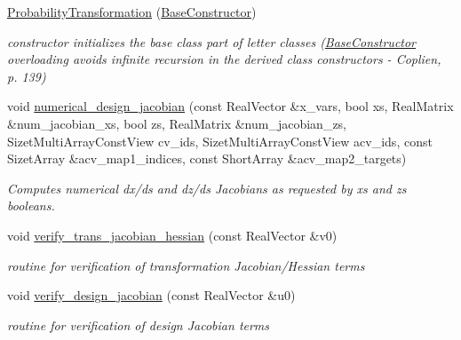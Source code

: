 \begin{DoxyCompactItemize}
\item 
\hyperlink{classPecos_1_1ProbabilityTransformation_a93e51d98c47f5a406a0cf59130cf8927}{Probability\+Transformation} (\hyperlink{structPecos_1_1BaseConstructor}{Base\+Constructor})
\begin{DoxyCompactList}\small\item\em constructor initializes the base class part of letter classes (\hyperlink{structPecos_1_1BaseConstructor}{Base\+Constructor} overloading avoids infinite recursion in the derived class constructors -\/ Coplien, p. 139) \end{DoxyCompactList}\item 
void \hyperlink{classPecos_1_1ProbabilityTransformation_aa887fb92365b3a6e3c115deb0eca63e7}{numerical\+\_\+design\+\_\+jacobian} (const Real\+Vector \&x\+\_\+vars, bool xs, Real\+Matrix \&num\+\_\+jacobian\+\_\+xs, bool zs, Real\+Matrix \&num\+\_\+jacobian\+\_\+zs, Sizet\+Multi\+Array\+Const\+View cv\+\_\+ids, Sizet\+Multi\+Array\+Const\+View acv\+\_\+ids, const Sizet\+Array \&acv\+\_\+map1\+\_\+indices, const Short\+Array \&acv\+\_\+map2\+\_\+targets)
\begin{DoxyCompactList}\small\item\em Computes numerical dx/ds and dz/ds Jacobians as requested by xs and zs booleans. \end{DoxyCompactList}\item 
void \hyperlink{classPecos_1_1ProbabilityTransformation_ad7de2f468959ee0d2549075839317caf}{verify\+\_\+trans\+\_\+jacobian\+\_\+hessian} (const Real\+Vector \&v0)\label{classPecos_1_1ProbabilityTransformation_ad7de2f468959ee0d2549075839317caf}

\begin{DoxyCompactList}\small\item\em routine for verification of transformation Jacobian/\+Hessian terms \end{DoxyCompactList}\item 
void \hyperlink{classPecos_1_1ProbabilityTransformation_af7ddb3207a033ee3e6c431a01c4e9bcb}{verify\+\_\+design\+\_\+jacobian} (const Real\+Vector \&u0)\label{classPecos_1_1ProbabilityTransformation_af7ddb3207a033ee3e6c431a01c4e9bcb}

\begin{DoxyCompactList}\small\item\em routine for verification of design Jacobian terms \end{DoxyCompactList}\end{DoxyCompactItemize}
